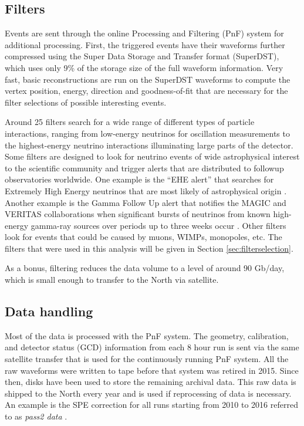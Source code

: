 \subsection{Filters}
\label{subsec:filters}
Events are sent through the online Processing and Filtering (PnF) system for additional processing. First, the triggered events have their waveforms further compressed using the Super Data Storage and Transfer format (SuperDST), which uses only 9\% of the storage size of the full waveform information. Very fast, basic reconstructions are run on the SuperDST waveforms to compute the vertex position, energy, direction and goodness-of-fit that are necessary for the filter selections of possible interesting events.

Around 25 filters search for a wide range of different types of particle interactions, ranging from low-energy neutrinos for oscillation measurements to the highest-energy neutrino interactions illuminating large parts of the detector. Some filters are designed to look for neutrino events of wide astrophysical interest to the scientific community and trigger alerts that are distributed to followup observatories worldwide. One example is the ``EHE alert'' that searches for Extremely High Energy neutrinos that are most likely of astrophysical origin \cite{Aartsen:2016lmt}. Another example is the Gamma Follow Up alert that notifies the MAGIC and VERITAS collaborations when significant bursts of neutrinos from known high-energy gamma-ray sources over periods up to three weeks occur \cite{1412973}. Other filters look for events that could be caused by muons, WIMPs, monopoles, etc. The filters that were used in this analysis will be given in Section \ref{sec:filterselection}.

As a bonus, filtering reduces the data volume to a level of around 90 Gb/day, which is small enough to transfer to the North via satellite.

\subsection{Data handling}
\label{subsec:datahandling}
Most of the data is processed with the PnF system. The geometry, calibration, and detector status (GCD) information from each 8 hour run is sent via the same satellite transfer that is used for the continuously running PnF system. All the raw waveforms were written to tape before that system was retired in 2015. Since then, disks have been used to store the remaining archival data. This raw data is shipped to the North every year and is used if reprocessing of data is necessary. An example is the SPE correction for all runs starting from 2010 to 2016 referred to as \textit{pass2 data} \cite{pass2}. \\

